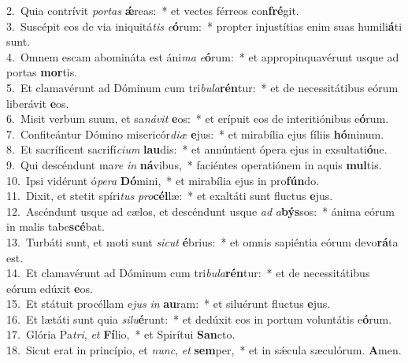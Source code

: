 {2.~}Quia contrívit \textit{por}\textit{tas} \textbf{ǽ}reas:~* et vectes férreos con\textbf{fré}git.\\
{3.~}Suscépit eos de via iniquitá\textit{tis} \textit{e}\textbf{ó}rum:~* propter injustítias enim suas humili\textbf{á}ti sunt.\\
{4.~}Omnem escam abomináta est áni\textit{ma} \textit{e}\textbf{ó}rum:~* et appropinquavérunt usque ad portas \textbf{mor}tis.\\
{5.~}Et clamavérunt ad Dóminum cum tri\textit{bu}\textit{la}\textbf{rén}tur:~* et de necessitátibus eórum liberávit \textbf{e}os.\\
{6.~}Misit verbum suum, et sa\textit{ná}\textit{vit} \textbf{e}os:~* et erípuit eos de interitiónibus e\textbf{ó}rum.\\
{7.~}Confiteántur Dómino misericór\textit{di}\textit{æ} \textbf{e}jus:~* et mirabília ejus fíliis \textbf{hó}minum.\\
{8.~}Et sacríficent sacrifí\textit{ci}\textit{um} \textbf{lau}dis:~* et annúntient ópera ejus in exsultati\textbf{ó}ne.\\
{9.~}Qui descéndunt ma\textit{re} \textit{in} \textbf{ná}vibus,~* faciéntes operatiónem in aquis \textbf{mul}tis.\\
{10.~}Ipsi vidérunt ó\textit{pe}\textit{ra} \textbf{Dó}mini,~* et mirabília ejus in pro\textbf{fún}do.\\
{11.~}Dixit, et stetit spíri\textit{tus} \textit{pro}\textbf{cél}læ:~* et exaltáti sunt fluctus \textbf{e}jus.\\
{12.~}Ascéndunt usque ad cælos, et descéndunt usque \textit{ad} \textit{a}\textbf{býs}sos:~* ánima eórum in malis tabe\textbf{scé}bat.\\
{13.~}Turbáti sunt, et moti sunt \textit{si}\textit{cut} \textbf{é}brius:~* et omnis sapiéntia eórum devo\textbf{rá}ta est.\\
{14.~}Et clamavérunt ad Dóminum cum tri\textit{bu}\textit{la}\textbf{rén}tur:~* et de necessitátibus eórum edúxit \textbf{e}os.\\
{15.~}Et státuit procéllam e\textit{jus} \textit{in} \textbf{au}ram:~* et siluérunt fluctus \textbf{e}jus.\\
{16.~}Et lætáti sunt quia \textit{si}\textit{lu}\textbf{é}runt:~* et dedúxit eos in portum voluntátis e\textbf{ó}rum.\\
{17.~}Glória Pa\textit{tri}, \textit{et} \textbf{Fí}lio,~* et Spirítui \textbf{San}cto.\\
{18.~}Sicut erat in princípio, et \textit{nunc}, \textit{et} \textbf{sem}per,~* et in sǽcula sæculórum. \textbf{A}men.\\
